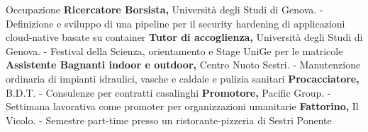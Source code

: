 \begin{rubric}{Occupazione}
\entry*[07/2024 -- 10/2025]%
	\textbf{Ricercatore Borsista,} Università degli Studi di Genova.\newline
    - Definizione e sviluppo di una pipeline per il security hardening di applicazioni cloud-native basate su container 
%
\entry*[2023 -- 2024]%
	\textbf{Tutor di accoglienza,} Università degli Studi di Genova.\newline
    -  Festival della Scienza, orientamento e Stage UniGe per le matricole
%
\entry*[2018 -- 06/2024]%
	\textbf{Assistente Bagnanti indoor e outdoor,}  Centro Nuoto Sestri.\newline
    - Manutenzione ordinaria di impianti idraulici, vasche e caldaie e pulizia sanitari
%
%
\entry*[2020]%
	\textbf{Procacciatore,} B.D.T.\newline
    - Consulenze per contratti casalinghi
%
\entry*[2020]%
	\textbf{Promotore,} Pacific Group.\newline
    - Settimana lavorativa come promoter per organizzazioni umanitarie
%
\entry*[2019 -- 2020]%
	\textbf{Fattorino,} Il Vicolo.\newline
    - Semestre part-time presso un ristorante-pizzeria di Sestri Ponente
%
\end{rubric}
